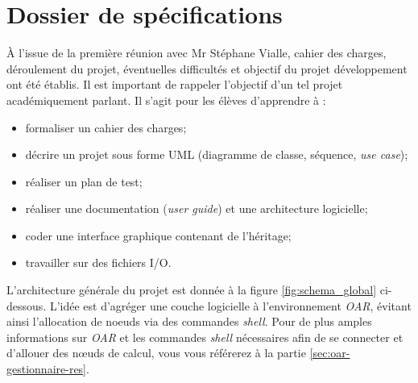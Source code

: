 \section{Dossier de spécifications}

\par À l’issue de la première réunion avec Mr Stéphane Vialle, cahier des charges, déroulement du projet, éventuelles difficultés et objectif du projet développement ont été établis. Il est important de rappeler l'objectif d'un tel projet académiquement parlant. Il s'agit pour les élèves d'apprendre à :

\begin{itemize}
\item formaliser un cahier des charges;
\item décrire un projet sous forme UML (diagramme de classe, séquence, \emph{use case});
\item réaliser un plan de test;
\item réaliser une documentation (\emph{user guide}) et une architecture logicielle;
\item coder une interface graphique contenant de l’héritage;
\item travailler sur des fichiers I/O.
\end{itemize}

\par L’architecture générale du projet est donnée à la figure \vref{fig:schema_global} ci-dessous. L’idée est d’agréger une couche logicielle à l’environnement \emph{OAR}, évitant ainsi l'allocation de noeuds via des commandes \emph{shell}.  Pour de plus amples informations sur \emph{OAR} et les commandes \emph{shell} nécessaires afin de se connecter et d’allouer des nœuds de calcul, vous vous référerez à la partie \vref{sec:oar-gestionnaire-res}.

